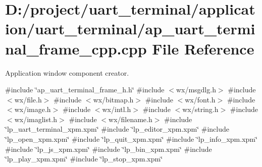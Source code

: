 \section{D\+:/project/uart\+\_\+terminal/application/uart\+\_\+terminal/ap\+\_\+uart\+\_\+terminal\+\_\+frame\+\_\+cpp.cpp File Reference}
\label{ap__uart__terminal__frame__cpp_8cpp}


Application window component creator.  


{\ttfamily \#include \char`\"{}ap\+\_\+uart\+\_\+terminal\+\_\+frame\+\_\+h.\+h\char`\"{}}\newline
{\ttfamily \#include $<$wx/msgdlg.\+h$>$}\newline
{\ttfamily \#include $<$wx/file.\+h$>$}\newline
{\ttfamily \#include $<$wx/bitmap.\+h$>$}\newline
{\ttfamily \#include $<$wx/font.\+h$>$}\newline
{\ttfamily \#include $<$wx/image.\+h$>$}\newline
{\ttfamily \#include $<$wx/intl.\+h$>$}\newline
{\ttfamily \#include $<$wx/string.\+h$>$}\newline
{\ttfamily \#include $<$wx/imaglist.\+h$>$}\newline
{\ttfamily \#include $<$wx/filename.\+h$>$}\newline
{\ttfamily \#include \char`\"{}lp\+\_\+uart\+\_\+terminal\+\_\+xpm.\+xpm\char`\"{}}\newline
{\ttfamily \#include \char`\"{}lp\+\_\+editor\+\_\+xpm.\+xpm\char`\"{}}\newline
{\ttfamily \#include \char`\"{}lp\+\_\+open\+\_\+xpm.\+xpm\char`\"{}}\newline
{\ttfamily \#include \char`\"{}lp\+\_\+quit\+\_\+xpm.\+xpm\char`\"{}}\newline
{\ttfamily \#include \char`\"{}lp\+\_\+info\+\_\+xpm.\+xpm\char`\"{}}\newline
{\ttfamily \#include \char`\"{}lp\+\_\+js\+\_\+xpm.\+xpm\char`\"{}}\newline
{\ttfamily \#include \char`\"{}lp\+\_\+bin\+\_\+xpm.\+xpm\char`\"{}}\newline
{\ttfamily \#include \char`\"{}lp\+\_\+play\+\_\+xpm.\+xpm\char`\"{}}\newline
{\ttfamily \#include \char`\"{}lp\+\_\+stop\+\_\+xpm.\+xpm\char`\"{}}\newline
